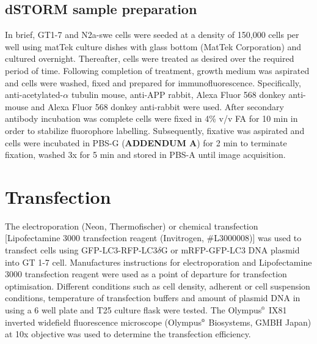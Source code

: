 \subsection{dSTORM sample preparation}
In brief, GT1-7 and N2a-swe cells were seeded at a density of 150,000 cells per well using matTek culture dishes with glass bottom (MatTek Corporation) and cultured overnight. Thereafter, cells were treated as desired over the required period of time. Following completion of treatment, growth medium was aspirated and cells were washed, fixed and prepared for immunofluorescence. Specifically, anti-acetylated-$\alpha$ tubulin mouse, anti-APP rabbit, Alexa Fluor 568 donkey anti-mouse and Alexa Fluor 568 donkey anti-rabbit were used. After secondary antibody incubation was complete cells were fixed in 4\% v/v FA for 10 min in order to stabilize fluorophore labelling. Subsequently, fixative was aspirated and cells were incubated in PBS-G (\textbf{ADDENDUM A}) for 2 min to terminate fixation, washed 3x for 5 min and stored in PBS-A until image acquisition. 

\section{Transfection} 
The electroporation (Neon, Thermofischer) or chemical transfection [Lipofectamine 3000 transfection reagent (Invitrogen, \#L3000008)] was used to transfect cells using GFP-LC3-RFP-LC3$\delta$G or mRFP-GFP-LC3 DNA plasmid into GT 1-7 cell. Manufactures instructions for electroporation and Lipofectamine 3000 transfection reagent were used as a point of departure for transfection optimisation. Different conditions such as cell density, adherent or cell suspension conditions, temperature of transfection buffers and amount of plasmid DNA in using a 6 well plate and T25 culture flask were tested. The Olympus${\textsuperscript{\tiny{\textregistered}}}$ IX81 inverted widefield fluorescence microscope (Olympus${\textsuperscript{\tiny{\textregistered}}}$ Biosystems, GMBH Japan) at 10x objective was used to determine the transfection efficiency.

